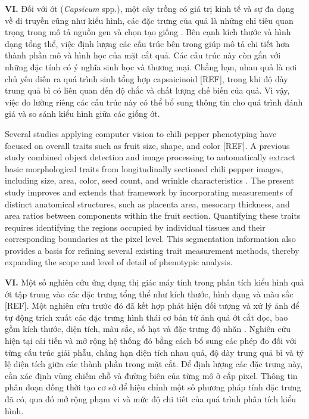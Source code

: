 \documentclass[final,1p,11pt,longtitle]{elsarticle}
\newenvironment{viet}{\par\smallskip\begingroup\color{viColor}\noindent\textbf{VI. }\ignorespaces}{\par\endgroup\smallskip}
\begin{document}
\begin{viet}
Đối với ớt (\textit{Capsicum} spp.), một cây trồng có giá trị kinh tế và sự đa dạng về di truyền cũng như kiểu hình, các đặc trưng của quả là những chỉ tiêu quan trọng trong mô tả nguồn gen và chọn tạo giống \cite{tripodi}. Bên cạnh kích thước và hình dạng tổng thể, việc định lượng các cấu trúc bên trong giúp mô tả chi tiết hơn thành phần mô và hình học của mặt cắt quả. Các cấu trúc này còn gắn với những đặc tính có ý nghĩa sinh học và thương mại. Chẳng hạn, nhau quả là nơi chủ yếu diễn ra quá trình sinh tổng hợp capsaicinoid [REF], trong khi độ dày trung quả bì có liên quan đến độ chắc và chất lượng chế biến của quả. Vì vậy, việc đo lường riêng các cấu trúc này có thể bổ sung thông tin cho quá trình đánh giá và so sánh kiểu hình giữa các giống ớt.
\end{viet}


Several studies applying computer vision to chili pepper phenotyping have focused on overall traits such as fruit size, shape, and color [REF]. A previous study combined object detection and image processing to automatically extract basic morphological traits from longitudinally sectioned chili pepper images, including size, area, color, seed count, and wrinkle characteristics \cite{ver1}. The present study improves and extends that framework by incorporating measurements of distinct anatomical structures, such as placenta area, mesocarp thickness, and area ratios between components within the fruit section. Quantifying these traits requires identifying the regions occupied by individual tissues and their corresponding boundaries at the pixel level. This segmentation information also provides a basis for refining several existing trait measurement methods, thereby expanding the scope and level of detail of phenotypic analysis.

\begin{viet}
Một số nghiên cứu ứng dụng thị giác máy tính trong phân tích kiểu hình quả ớt tập trung vào các đặc trưng tổng thể như kích thước, hình dạng và màu sắc [REF]. Một nghiên cứu trước đó đã kết hợp phát hiện đối tượng và xử lý ảnh để tự động trích xuất các đặc trưng hình thái cơ bản từ ảnh quả ớt cắt dọc, bao gồm kích thước, diện tích, màu sắc, số hạt và đặc trưng độ nhăn \cite{ver1}. Nghiên cứu hiện tại cải tiến và mở rộng hệ thống đó bằng cách bổ sung các phép đo đối với từng cấu trúc giải phẫu, chẳng hạn diện tích nhau quả, độ dày trung quả bì và tỷ lệ diện tích giữa các thành phần trong mặt cắt. Để định lượng các đặc trưng này, cần xác định vùng chiếm chỗ và đường biên của từng mô ở cấp pixel. Thông tin phân đoạn đồng thời tạo cơ sở để hiệu chỉnh một số phương pháp tính đặc trưng đã có, qua đó mở rộng phạm vi và mức độ chi tiết của quá trình phân tích kiểu hình.
\end{viet}
\end{document}
